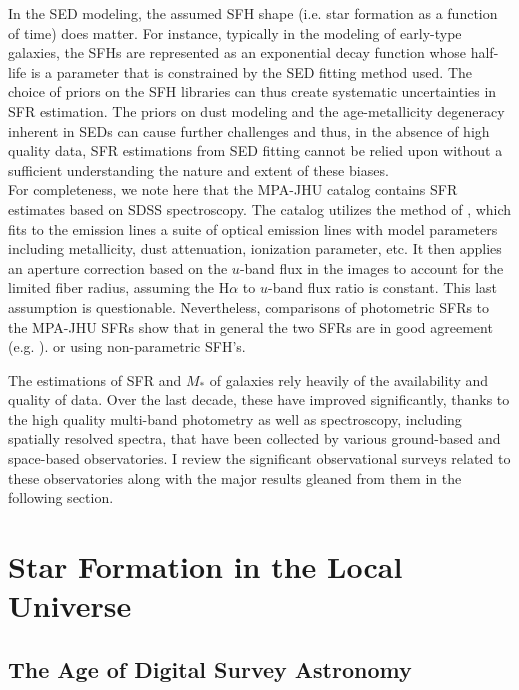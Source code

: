 In the SED modeling, the assumed SFH shape (i.e. star formation as a
function of time) does matter. For instance, typically in the modeling
of early-type galaxies, the SFHs are represented as an exponential
decay function whose half-life is a parameter that is constrained by
the SED fitting method used. The choice of priors on the SFH libraries
can thus create systematic uncertainties in SFR estimation. The priors
on dust modeling and the age-metallicity degeneracy inherent in SEDs
can cause further challenges and thus, in the absence of high quality
data, SFR estimations from SED fitting cannot be relied upon without a
sufficient understanding the nature and extent of these biases.\\

For completeness, we note here that the MPA-JHU catalog contains SFR
estimates based on SDSS spectroscopy. The catalog utilizes the method
of \citet{brinchmann_physical_2004}, which fits to the emission lines
a suite of optical emission lines with model parameters including
metallicity, dust attenuation, ionization parameter, etc. It then
applies an aperture correction based on the $u$-band flux in the
images to account for the limited fiber radius, assuming the H$\alpha$
to $u$-band flux ratio is constant. This last assumption is
questionable. Nevertheless, comparisons of photometric SFRs to 
the MPA-JHU SFRs show that in general the two SFRs are in good
agreement (e.g. \citealt{salim_uv_2007}).
or using non-parametric SFH's.

The estimations of SFR and $M_{*}$ of galaxies rely heavily of the
availability and quality of data. Over the last decade, these have
improved significantly, thanks to the high quality multi-band
photometry as well as spectroscopy, including spatially resolved
spectra, that have been collected by various ground-based and
space-based observatories. I review the significant observational
surveys related to these observatories along with the major results
gleaned from them in the following section.\\

\section{Star Formation in the Local Universe}

\subsection{The Age of Digital Survey Astronomy}
\label{sec: surveys}


